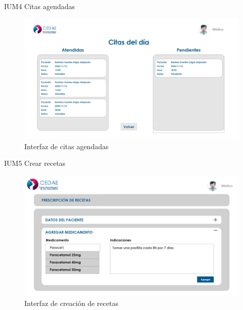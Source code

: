 \documentclass[12pt,letterpaper]{article}
\begin{document}
        IUM4 Citas agendadas
            \begin{figure}[H]
                \centering
                \includegraphics [scale=0.2]{interfaces/med_ver_citas}
                \caption{Interfaz de citas agendadas}
            \end{figure}
        IUM5 Crear recetas
            \begin{figure}[H]
                \centering
                \includegraphics [scale=0.2]{interfaces/med_crear_receta}
                \caption{Interfaz de creación de recetas}
            \end{figure}
\end{document}
